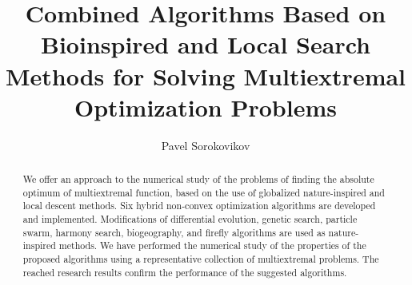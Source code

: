 \begin{englishtitle} %
\title{Combined Algorithms Based on Bioinspired and Local Search Methods for Solving Multiextremal Optimization Problems}
\author{Pavel Sorokovikov
}

\maketitle

\begin{abstract}
We offer an approach to the numerical study of the problems of finding the absolute optimum of multiextremal function, based on the use of globalized nature-inspired and local descent methods. Six hybrid non-convex optimization algorithms are developed and implemented. Modifications of differential evolution, genetic search, particle swarm, harmony search, biogeography, and firefly algorithms are used as nature-inspired methods. We have performed the numerical study of the properties of the proposed algorithms using a representative collection of multiextremal problems. The reached research results confirm the performance of the suggested algorithms.

\end{abstract}
\end{englishtitle}

\iffalse

%
%

